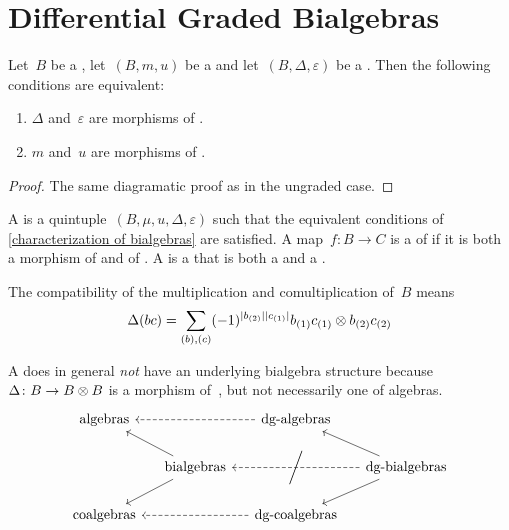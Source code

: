 \documentclass[a4paper,10pt,headings=standardclasses]{scrartcl}
\begin{document}
\section{Differential Graded Bialgebras}

\begin{lemma}
  \label{characterization of bialgebras}
  Let~$B$ be a {\dgv}, let~$(B, m, u)$ be a {\dga} and let~$(B, \Delta, \varepsilon)$ be a {\dgc}.
  Then the following conditions are equivalent:
  \begin{enumerate}
    \item
      $\Delta$ and~$\varepsilon$ are morphisms of {\dgas}.
    \item
      $m$ and~$u$ are morphisms of {\dgcs}.
  \end{enumerate}
\end{lemma}

\begin{proof}
  The same diagramatic proof as in the ungraded case.
\end{proof}

\begin{definition}
  A  is a quintuple~$(B, \mu, u, \Delta, \varepsilon)$ such that the equivalent conditions of \cref{characterization of bialgebras} are satisfied.
  A map~$f \colon B \to C$ is a  of {\dgbs} if it is both a morphism of {\dgas} and of {\dgcs}.
  A  is a {\dgsub} that is both a {\dgi} and a {\dgci}.
\end{definition}

\begin{remark}
  The compatibility of the multiplication and comultiplication of~$B$ means
  \begin{gather*}
    \Delta(bc)
    =
    \sum_{(b), (c)}
    (-1)^{\lvert b_{(2)}\rvert \lvert c_{(1)}\rvert}
    b_{(1)} c_{(1)} \otimes b_{(2)} c_{(2)}
  \end{gather*}

\end{remark}


\begin{warning}
  A {\dgb} does in general \emph{not} have an underlying bialgebra structure because~$\Delta \colon B \to B \otimes B$ is a morphism of~{\dgas}, but not necessarily one of algebras.
  \[
    \begin{tikzcd}[column sep = small]
      \text{algebras}
      &
      {}
      &
      \text{\dgas}
      \arrow[dashed]{ll}
      &
      {}
      \\
      {}
      &
      \text{bialgebras}
      \arrow{ul}
      \arrow{dl}
      &
      {}
      &
      \text{\dgbs}
      \arrow{ul}
      \arrow[dashed]{ll}[{anchor=center,sloped}]{\bigg/}
      \arrow{dl}
      \\
      \text{coalgebras}
      &
      {}
      &
      \text{\dgcs}
      \arrow[dashed]{ll}
      &
      {}
    \end{tikzcd}
  \]
\end{warning}
\end{document}
